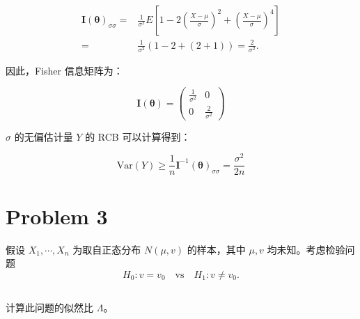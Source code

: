 \documentclass[12pt,a4paper]{article}
\begin{document}
\begin{answerbox}
$$
\begin{aligned}
\mathbf{I}(\mathbf{\theta})_{\sigma\sigma} =& \frac{1}{\sigma^2}E\left[1-2\left(\frac{X-\mu}{\sigma}\right)^2+\left(\frac{X-\mu}{\sigma}\right)^4\right] \\
=& \frac{1}{\sigma^2}\left(1 - 2 + (2 + 1)\right) = \frac{2}{\sigma^2}. 
\end{aligned}
$$

因此，Fisher 信息矩阵为：

$$
\mathbf{I}(\mathbf{\theta}) = \begin{pmatrix}
\frac{1}{\sigma^2} & 0 \\
0 & \frac{2}{\sigma^2}
\end{pmatrix}
$$

$\sigma$ 的无偏估计量 $Y$ 的 RCB 可以计算得到：

$$
\text{Var}(Y) \geq \frac{1}{n} \mathbf{I}^{-1}(\mathbf{\theta})_{\sigma\sigma} = \frac{\sigma^2}{2n}
$$
\end{answerbox}

\section{Problem 3}

假设 $X_1,\cdots,X_n$ 为取自正态分布 $N(\mu,v)$ 的样本，其中 $\mu,v$ 均未知。考虑检验问题
\[
H_0:v=v_0 \quad \mathrm{vs}\quad H_1:v\neq v_0.
\]

\subsection{}

计算此问题的似然比 $\Lambda$。
\end{document}
